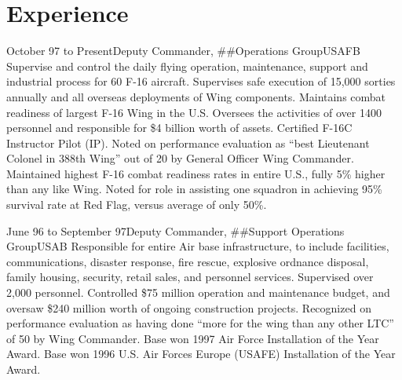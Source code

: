 \documentclass[9pt,letterpaper,times]{mtresume}
\begin{document}
\maketitle
\thispagestyle{empty} %


\section*{Experience}

\begin{job}{October 97 to Present}{Deputy Commander, \#\#Operations Group}{USAFB}{%
Supervise and control the daily flying operation, maintenance, support and industrial process for 60 F-16 aircraft. Supervises safe execution of 15,000 sorties annually and all overseas deployments of Wing components. Maintains combat readiness of largest F-16 Wing in the U.S. Oversees the activities of over 1400 personnel and responsible for \$4 billion worth of assets. Certified F-16C Instructor Pilot (IP).
}
\accomplishment Noted on performance evaluation as ``best Lieutenant Colonel in 388th Wing'' out of 20 by General Officer Wing Commander.
\accomplishment Maintained highest F-16 combat readiness rates in entire U.S., fully 5\% higher than any like Wing.
\accomplishment Noted for role in assisting one squadron in achieving 95\% survival rate at Red Flag, versus average of only 50\%.
\end{job}

\begin{job}{June 96 to September 97}{Deputy Commander, \#\#Support Operations Group}{USAB}{%
Responsible for entire Air base infrastructure, to include facilities, communications, disaster response, fire rescue, explosive ordnance disposal, family housing,
security, retail sales, and personnel services. Supervised over 2,000 personnel. Controlled \$75 million operation and maintenance
budget, and oversaw \$240 million worth of ongoing construction projects.
}
\accomplishment Recognized on performance evaluation as having done ``more for the wing than any other LTC'' of 50 by Wing Commander.
\accomplishment Base won 1997 Air Force Installation of the Year Award.
\accomplishment Base won 1996 U.S. Air Forces Europe (USAFE) Installation of the Year Award.
\end{job}
\end{document}
